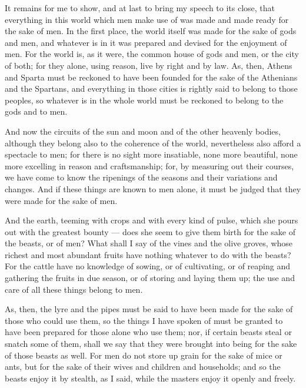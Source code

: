 It remains for me to show, and at last to bring my speech to its close, that everything in this world which men make use of was made and made ready for the sake of men. In the first place, the world itself was made for the sake of gods and men, and whatever is in it was prepared and devised for the enjoyment of men. For the world is, as it were, the common house of gods and men, or the city of both; for they alone, using reason, live by right and by law. As, then, Athens and Sparta must be reckoned to have been founded for the sake of the Athenians and the Spartans, and everything in those cities is rightly said to belong to those peoples, so whatever is in the whole world must be reckoned to belong to the gods and to men.

 And now the circuits of the sun and moon and of the other heavenly bodies, although they belong also to the coherence of the world, nevertheless also afford a spectacle to men; for there is no sight more insatiable, none more beautiful, none more excelling in reason and craftsmanship; for, by measuring out their courses, we have come to know the ripenings of the seasons and their variations and changes. And if these things are known to men alone, it must be judged that they were made for the sake of men.

 And the earth, teeming with crops and with every kind of pulse, which she pours out with the greatest bounty — does she seem to give them birth for the sake of the beasts, or of men? What shall I say of the vines and the olive groves, whose richest and most abundant fruits have nothing whatever to do with the beasts? For the cattle have no knowledge of sowing, or of cultivating, or of reaping and gathering the fruits in due season, or of storing and laying them up; the use and care of all these things belong to men.

 As, then, the lyre and the pipes must be said to have been made for the sake of those who could use them, so the things I have spoken of must be granted to have been prepared for those alone who use them; nor, if certain beasts steal or snatch some of them, shall we say that they were brought into being for the sake of those beasts as well. For men do not store up grain for the sake of mice or ants, but for the sake of their wives and children and households; and so the beasts enjoy it by stealth, as I said, while the masters enjoy it openly and freely.

